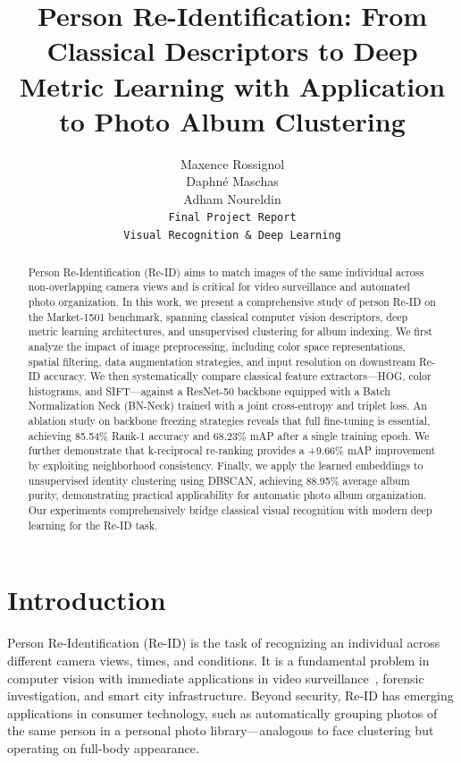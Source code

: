 \documentclass[final]{cvpr}
\title{Person Re-Identification: From Classical Descriptors to Deep Metric Learning with Application to Photo Album Clustering}
\author{
Maxence Rossignol\\
Daphné Maschas\\
Adham Noureldin\\
{\tt\small Final Project Report}\\
{\tt\small Visual Recognition \& Deep Learning}
}
\begin{document}
\maketitle

\begin{abstract}
Person Re-Identification (Re-ID) aims to match images of the same individual across non-overlapping camera views and is critical for video surveillance and automated photo organization.
In this work, we present a comprehensive study of person Re-ID on the Market-1501 benchmark, spanning classical computer vision descriptors, deep metric learning architectures, and unsupervised clustering for album indexing.
We first analyze the impact of image preprocessing, including color space representations, spatial filtering, data augmentation strategies, and input resolution on downstream Re-ID accuracy.
We then systematically compare classical feature extractors---HOG, color histograms, and SIFT---against a ResNet-50 backbone equipped with a Batch Normalization Neck (BN-Neck) trained with a joint cross-entropy and triplet loss.
An ablation study on backbone freezing strategies reveals that full fine-tuning is essential, achieving 85.54\% Rank-1 accuracy and 68.23\% mAP after a single training epoch.
We further demonstrate that k-reciprocal re-ranking provides a +9.66\% mAP improvement by exploiting neighborhood consistency.
Finally, we apply the learned embeddings to unsupervised identity clustering using DBSCAN, achieving 88.95\% average album purity, demonstrating practical applicability for automatic photo album organization.
Our experiments comprehensively bridge classical visual recognition with modern deep learning for the Re-ID task.
\end{abstract}

\section{Introduction}

Person Re-Identification (Re-ID) is the task of recognizing an individual across different camera views, times, and conditions.
It is a fundamental problem in computer vision with immediate applications in video surveillance~\cite{zheng2016person}, forensic investigation, and smart city infrastructure.
Beyond security, Re-ID has emerging applications in consumer technology, such as automatically grouping photos of the same person in a personal photo library---analogous to face clustering but operating on full-body appearance.
\end{document}

